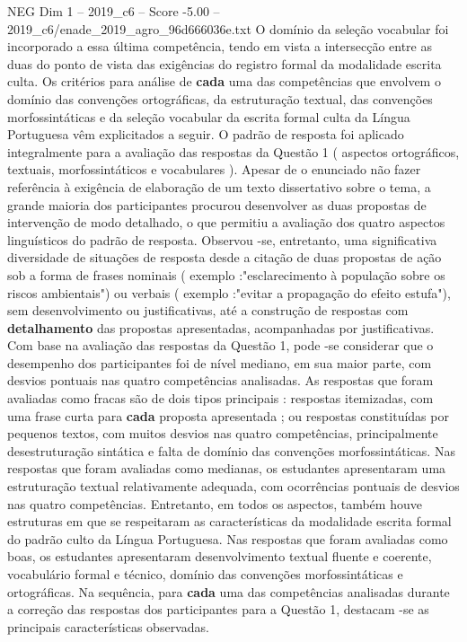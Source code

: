 \begin{textsample}{NEG Dim 1 – 2019\_c6 – Score -5.00 – 2019\_c6/enade\_2019\_agro\_96d666036e.txt}
O domínio da seleção vocabular foi incorporado a essa última competência, tendo em vista a intersecção entre as duas do ponto de vista das exigências do registro formal da modalidade escrita culta.
Os critérios para análise de \textbf{cada} uma das competências que envolvem o domínio das convenções ortográficas, da estruturação textual, das convenções morfossintáticas e da seleção vocabular da escrita formal culta da Língua Portuguesa vêm explicitados a seguir.
O padrão de resposta foi aplicado integralmente para a avaliação das respostas da Questão 1 ( aspectos ortográficos, textuais, morfossintáticos e vocabulares ).
Apesar de o enunciado não fazer referência à exigência de elaboração de um texto dissertativo sobre o tema, a grande maioria dos participantes procurou desenvolver as duas propostas de intervenção de modo detalhado, o que permitiu a avaliação dos quatro aspectos linguísticos do padrão de resposta.
Observou -se, entretanto, uma significativa diversidade de situações de resposta desde a citação de duas propostas de ação sob a forma de frases nominais ( exemplo :"esclarecimento à população sobre os riscos ambientais") ou verbais ( exemplo :"evitar a propagação do efeito estufa"), sem desenvolvimento ou justificativas, até a construção de respostas com \textbf{detalhamento} das propostas apresentadas, acompanhadas por justificativas.
Com base na avaliação das respostas da Questão 1, pode -se considerar que o desempenho dos participantes foi de nível mediano, em sua maior parte, com desvios pontuais nas quatro competências analisadas.
As respostas que foram avaliadas como fracas são de dois tipos principais : respostas itemizadas, com uma frase curta para \textbf{cada} proposta apresentada ; ou respostas constituídas por pequenos textos, com muitos desvios nas quatro competências, principalmente desestruturação sintática e falta de domínio das convenções morfossintáticas.
Nas respostas que foram avaliadas como medianas, os estudantes apresentaram uma estruturação textual relativamente adequada, com ocorrências pontuais de desvios nas quatro competências.
Entretanto, em todos os aspectos, também houve estruturas em que se respeitaram as características da modalidade escrita formal do padrão culto da Língua Portuguesa.
Nas respostas que foram avaliadas como boas, os estudantes apresentaram desenvolvimento textual fluente e coerente, vocabulário formal e técnico, domínio das convenções morfossintáticas e ortográficas.
Na sequência, para \textbf{cada} uma das competências analisadas durante a correção das respostas dos participantes para a Questão 1, destacam -se as principais características observadas.

\end{textsample}
